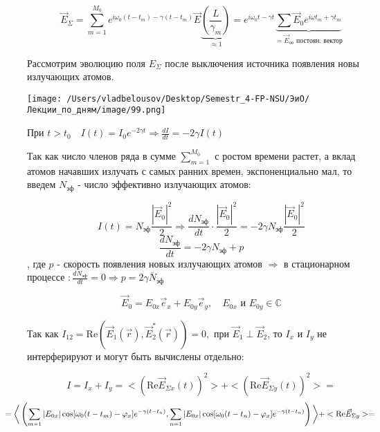 \documentclass[12pt, a4paper]{report}
\begin{document}
\fi


\[ \vec{E }  _{\Sigma} = \sum_{m=1} ^{ M_0 } e^{i \omega_0 (t - t_m ) - \gamma (t - t_m ) }\vec{E }  \underbrace{\left( \frac{L}{\gamma_m }  \right)}_{\approx 1 } = e^{ i \omega_0 t - \gamma t } \underbrace{\sum \vec{E }  _0 e^{ i \omega t_m + \gamma t_m }}_{= \vec{E}  _{oo } \text{ постоян. вектор}  }     \]  



Рассмотрим эволюцию поля \( E_{\Sigma }  \) после выключения источника появления новы излучающих атомов. 

\begin{center}
    \texttt{[image: /Users/vladbelousov/Desktop/Semestr\_4-FP-NSU/ЭиО/Лекции\_по\_дням/image/99.png]}
\end{center} 
При \( \displaystyle t > t_0 \quad  I(t ) =I_0 e^{-2 \gamma t } \Rightarrow \frac{dI}{d t }  = - 2 \gamma I(t )  \) 

Так как число членов ряда в сумме \( \displaystyle  \sum_{m =1} ^{M_0}   \) с ростом времени растет, а вклад атомов начавших излучать с самых ранних времен, экспоненциально мал, то введем \( N_{\text{эф} }  \) - число эффективно излучающих атомов: 

\[ I(t) = N_{\text{эф} } \frac{|\vec{E } _0     | ^2 }{2 } \Rightarrow \frac{dN_{\text{эф} } }{dt }  \cdot \frac{ |\vec{E } _0| ^2 }{2 } = - 2 \gamma N_{\text{эф} } \frac{|\vec{E } _0  | ^2 }{2 }  \] 
\[ \frac{d N_{\text{эф} } }{dt } = - 2 \gamma N_{\text{эф} } + p  \] 
, где \( p \) - скорость появления новых излучающих атомов \( \Rightarrow  \)  в стационарном  процессе \(: \displaystyle  \frac{d N_{\text{эф} } }{dt } =0 \Rightarrow p = 2 \gamma \overline{N}_{\text{эф} }    \) 


\[ \vec{E }  _0 = E_{0x }  \vec{e}_x + E_{0 y }  \vec{e }  _y , \quad  E_{0 x }  \text{ и } E_{0 y}  \in \mathbb{C}    \] 

Так как \( \displaystyle  I_{12} = \mathrm{Re }  (\vec{E }  _1 (\vec{r } ), \vec{E }  _2^* (\vec{r } )) = 0 , \text{ при } \vec{E }_1 \perp \vec{E } _2   \), то \( I_x \text{  и } I_y  \)  не интерферируют и могут быть вычислены отдельно: 

\[ I = I_x + I_y = <(\mathrm{Re}  \vec{E }  _{\Sigma x } (t )  ) ^2> + <(\mathrm{Re}  \vec{E }  _{\Sigma y } (t )  ) ^2 > = \] 
\[\kern-1cm =\bigg< \left( \sum_{m=1} |E_{0x} | \cos [\omega_0 (t - t_m ) - \varphi_x]e^{ - \gamma (t -t_n )},  \sum_{n=1} |E_{0x} | \cos [\omega_0 (t - t_n) - \varphi_x]e^{ - \gamma (t -t_n )}\right)\bigg> +<\mathrm{Re }  \vec{E } _{\Sigma y}  >=\] 
\end{document}
